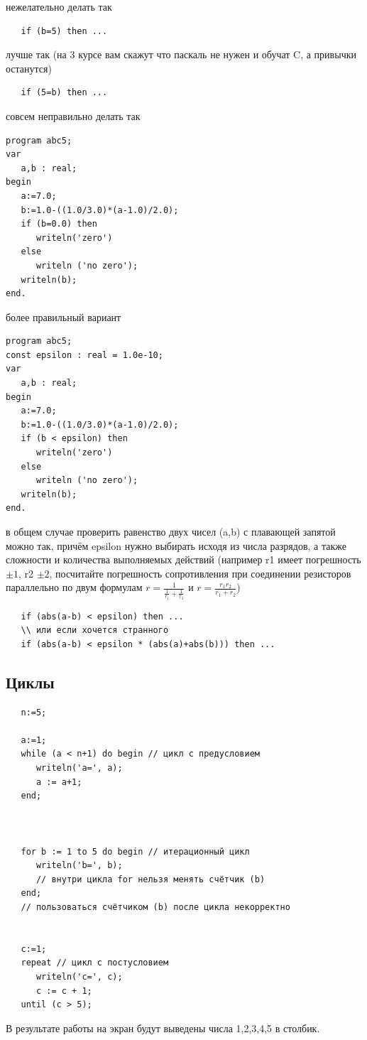 \documentclass[unicode, 12pt, a4paper,oneside,fleqn]{article}
\begin{document}
{\tiny
  нежелательно делать так
\begin{verbatim}
   if (b=5) then ...
\end{verbatim}
  лучше так (на 3 курсе вам скажут что паскаль
  не нужен и обучат C, а привычки останутся)
\begin{verbatim}
   if (5=b) then ...
\end{verbatim}
  
  
  совсем неправильно делать так
\begin{verbatim}
program abc5;
var 
   a,b : real;
begin
   a:=7.0;
   b:=1.0-((1.0/3.0)*(a-1.0)/2.0); 
   if (b=0.0) then
      writeln('zero')
   else
      writeln ('no zero');
   writeln(b);
end.
\end{verbatim}

  более правильный вариант
\begin{verbatim}
program abc5;
const epsilon : real = 1.0e-10;
var 
   a,b : real;
begin
   a:=7.0;
   b:=1.0-((1.0/3.0)*(a-1.0)/2.0); 
   if (b < epsilon) then
      writeln('zero')
   else
      writeln ('no zero');
   writeln(b);
end.
\end{verbatim}

  в общем случае проверить равенство двух чисел (a,b) с плавающей
  запятой можно так, причём epsilon нужно выбирать исходя из числа
  разрядов, а также сложности и количества выполняемых действий
  (например r1 имеет погрешность $\pm1$\textohm,  r2 $\pm2$\textohm, посчитайте
  погрешность сопротивления при соединении резисторов параллельно по двум формулам
  $r=\frac{1}{\frac{1}{r_1} + \frac{1}{r_2}}$ и $r=\frac{r_1r_2}{r_1 + r_2}$)

\begin{verbatim}
   if (abs(a-b) < epsilon) then ...
   \\ или если хочется странного
   if (abs(a-b) < epsilon * (abs(a)+abs(b))) then ...
\end{verbatim}
}

\subsection{Циклы}
\begin{verbatim}
   n:=5;
   
   a:=1;
   while (a < n+1) do begin // цикл с предусловием
      writeln('a=', a);
      a := a+1;
   end;
   
   
   
   for b := 1 to 5 do begin // итерационный цикл
      writeln('b=', b);
      // внутри цикла for нельзя менять счётчик (b)
   end;
   // пользоваться счётчиком (b) после цикла некорректно
   
   
   c:=1;
   repeat // цикл с постусловием
      writeln('c=', c);
      c := c + 1;
   until (c > 5);
\end{verbatim}
В результате работы на экран будут выведены числа 1,2,3,4,5 в столбик.
\end{document}
